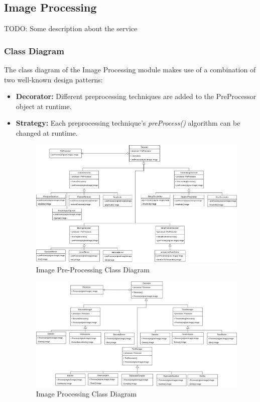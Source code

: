 \documentclass{article}
\begin{document}
\subsection{Image Processing}
TODO: Some description about the service
\subsubsection{Class Diagram}
The class diagram of the Image Processing module makes use of a combination of two well-known design patterns: 
\begin{itemize}
	\item \textbf{Decorator:} Different preprocessing techniques are added to the PreProcessor object at runtime.
	\item \textbf{Strategy:} Each preprocessing technique's \textit{preProcess()} algorithm can be changed at runtime.
	\begin{figure}[!h]
	    \centering
	    \includegraphics[scale=0.3]{img/imageProcessingClassDiagram.png}
	    \caption{Image Pre-Processing Class Diagram}
	 \end{figure}
	   \pagebreak
	 \begin{figure}[!h]
		\centering
	    \includegraphics[scale=0.3]{img/processingClassDiagram.png}
	    \caption{Image Processing Class Diagram}
	 \end{figure}
\end{itemize}
\end{document}
